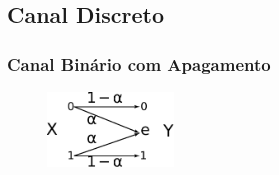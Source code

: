 \subsection{Canal Discreto}

\begin{frame}[allowframebreaks]
  \frametitle{Canal Binário com Apagamento}
                \begin{figure}[h!]
                \centering
                \includegraphics[width=0.3\textwidth]{images/bech.pdf}
                \label{fig:bech}
                \end{figure}


\end{frame}
